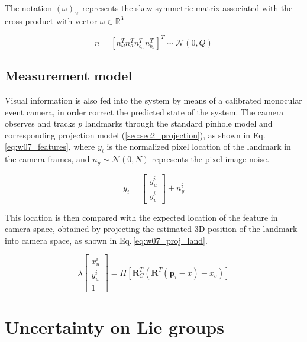 \documentclass[10pt,twocolumn]{IEEEtran}
\begin{document}
The notation $(\omega)_\times$ represents the skew symmetric matrix associated with the cross product with vector $\omega \in \mathbb{R}^3$

\begin{equation}
    n = \left[ n_\omega^T n_a^T n_{b_\omega}^T n_{b_a}^T \right]^T \sim \mathcal{N} (0,Q)
\end{equation}

\subsection{Measurement model}

Visual information is also fed into the system by means of a calibrated monocular event camera, in order correct the predicted state of the system. The camera observes and tracks $p$ landmarks through the standard pinhole model and corresponding projection model (\ref{sec:sec2_projection}), as shown in Eq.\,\ref{eq:w07_features}, where $y_i$ is the normalized pixel location of the landmark in the camera frames, and $n_y\sim \mathcal{N} (0,N)$ represents the pixel image noise.

\begin{equation}
    \label{eq:w07_features}
    y_i=\begin{bmatrix}
        y_u^i\\ y_v^i
    \end{bmatrix}
    +n_y^i
\end{equation}

This location is then compared with the expected location of the feature in camera space, obtained by projecting the estimated 3D position of the landmark into camera space, as shown in Eq.\,\eqref{eq:w07_proj_land}.

\begin{equation}
    \label{eq:w07_proj_land}
    \lambda \begin{bmatrix}
        x_u^i\\ 
        y_u^i\\ 
        1
        \end{bmatrix}
        =
        \Pi \left[
        \mathbf{R}_C^T\left(\mathbf{R}^T\left(\mathbf{p}_i-x
         \right ) -x_c
         \right )
         \right ]
\end{equation}

\section{Uncertainty on Lie groups}
\end{document}
